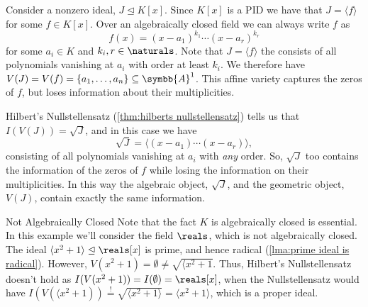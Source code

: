 \documentclass[fleqn]{NotesClass}
\newcommand{\subideal}{\trianglelefteq}
\newcommand{\affine}{\symbb{A}}
\begin{document}
    \begin{exm}{}{}
        Consider a nonzero ideal, \(J \subideal K[x]\).
        Since \(K[x]\) is a PID we have that \(J = \langle f \rangle\) for some \(f \in K[x]\).
        Over an algebraically closed field we can always write \(f\) as
        \begin{equation}
            f(x) = (x - a_1)^{k_1} \dotsm (x - a_r)^{k_r}
        \end{equation}
        for some \(a_i \in K\) and \(k_i, r \in \naturals\).
        Note that \(J = \langle f \rangle\) the consists of all polynomials vanishing at \(a_i\) with order at least \(k_i\).
        We therefore have \(V(J) = V(f) = \{a_1, \dotsc, a_n\} \subseteq \affine^1\).
        This affine variety captures the zeros of \(f\), but loses information about their multiplicities.
        
        Hilbert's Nullstellensatz (\cref{thm:hilberts nullstellensatz}) tells us that \(I(V(J)) = \sqrt{J}\), and in this case we have
        \begin{equation}
            \sqrt{J} = \langle (x - a_1) \dotsm (x - a_r) \rangle,
        \end{equation}
        consisting of all polynomials vanishing at \(a_i\) with \emph{any} order.
        So, \(\sqrt{J}\) too contains the information of the zeros of \(f\) while losing the information on their multiplicities.
        In this way the algebraic object, \(\sqrt{J}\), and the geometric object, \(V(J)\), contain exactly the same information.
    \end{exm}
    
    \begin{exm}{Not Algebraically Closed}{}
        Note that the fact \(K\) is algebraically closed is essential.
        In this example we'll consider the field \(\reals\), which is not algebraically closed.
        The ideal \(\langle x^2 + 1 \rangle \subideal \reals[x]\) is prime, and hence radical (\cref{lma:prime ideal is radical}).
        However, \(V(x^2 + 1) = \emptyset \ne \sqrt{\langle{x^2 + 1}}\).
        Thus, Hilbert's Nullstellensatz doesn't hold as \(I(V( x^2 + 1 )) = I(\emptyset) = \reals[x]\), when the Nullstellensatz would have \(I(V(\langle x^2 + 1)) \stackrel{!}{=} \sqrt{\langle x^2 + 1 \rangle} = \langle x^2 + 1 \rangle\), which is a proper ideal.
    \end{exm}
    
\end{document}
